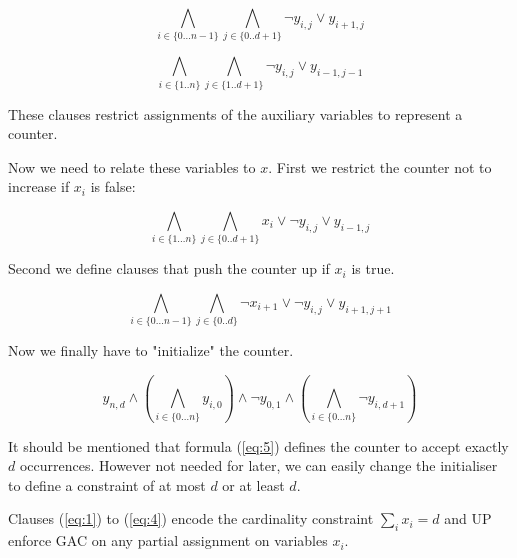 \documentclass[]{llncs}
\begin{document}
\begin{equation} \label{eq:1}
    \bigwedge_{i \in \{0\ldots n-1\}} \bigwedge_{j \in\{0..d+1\}}
    \neg y_{i,j} \vee y_{i+1,j}
\end{equation}

\begin{equation} \label{eq:2}
    \bigwedge_{i \in \{1..n\}} \bigwedge_{j\in \{1..d+1\}}
    \neg y_{i,j} \vee y_{i-1,j-1}
\end{equation}

These clauses restrict assignments of the auxiliary variables to 
represent a counter.

Now we need to relate these variables to $x$.  First we restrict the
counter not to increase if $x_{i}$ is false:

\begin{equation} \label{eq:3}
    \bigwedge_{i \in \{1\ldots n\}} \bigwedge_{j\in\{0..d+1\}}
    x_{i} \vee \neg y_{i,j} \vee y_{i-1,j}
\end{equation}

Second we define clauses that push  the counter up if $x_i$ is true. 

\begin{equation} \label{eq:4}
    \bigwedge_{i \in \{0\ldots n-1\}} \bigwedge_{j\in\{0..d\}}
    \neg x_{i+1} \vee \neg y_{i,j} \vee y_{i+1,j+1}
\end{equation}

Now we finally have to "initialize" the counter. 

\begin{equation} \label{eq:5}
    y_{n,d} \wedge \left (\bigwedge_{i\in\{0\ldots n\}} y_{i,0} \right )\wedge \neg
    y_{0,1} \wedge \left(\bigwedge_{i\in\{0\ldots n\}} \neg
        y_{i,d+1}\right )
\end{equation}

It should be mentioned that formula (\ref{eq:5}) defines the counter to
accept exactly $d$ occurrences. However not needed for later, we can
easily change the initialiser to define a constraint of at most $d$ or
at least $d$. 

\begin{proposition} 
    Clauses (\ref{eq:1}) to (\ref{eq:4}) encode the cardinality
    constraint $ \sum_{i} x_{i} = d $ and UP enforce GAC on any partial
    assignment on variables $x_i$. 
\end{proposition}
\end{document}
